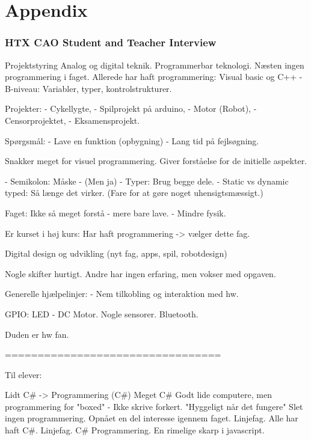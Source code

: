 \part{Appendix}

\section{HTX CAO Student and Teacher Interview}
\label{Interviews}
Projektstyring
Analog og digital teknik.
Programmerbar teknologi.
Næsten ingen programmering i faget.
Allerede har haft programmering: Visual basic og C++
- B-niveau: Variabler, typer, kontrolstrukturer. 


Projekter:
- Cykellygte,
- Spilprojekt på arduino,
- Motor (Robot),
- Censorprojektet,
- Eksamensprojekt.

Spørgsmål: 
- Lave en funktion (opbygning)
- Lang tid på fejlsøgning.

Snakker meget for visuel programmering.
Giver forståelse for de initielle aspekter.


- Semikolon: Måske - (Men ja)
- Typer: Brug begge dele.
- Static vs dynamic typed: Så længe det virker. (Fare for at gøre noget uhensigtsmæssigt.)

Faget: Ikke så meget forstå - mere bare lave. - Mindre fysik.

Er kurset i høj kurs: Har haft programmering -> vælger dette fag.

Digital design og udvikling (nyt fag, apps, spil, robotdesign)

Nogle skifter hurtigt. Andre har ingen erfaring, men vokser med opgaven.

Generelle hjælpelinjer:
- Nem tilkobling og interaktion med hw.

GPIO: LED - DC Motor. Nogle sensorer. Bluetooth.

Duden er hw fan.

=================================

Til elever:

Lidt C{\#} -> Programmering (C{\#})
Meget C{\#}
Godt lide computere, men programmering for "boxed" - Ikke skrive forkert. 
"Hyggeligt når det fungere"
Slet ingen programmering.
Opnået en del interesse igennem faget.
Linjefag. Alle har haft C{\#}.
Linjefag. C{\#} Programmering.
En rimelige skarp i javascript.

